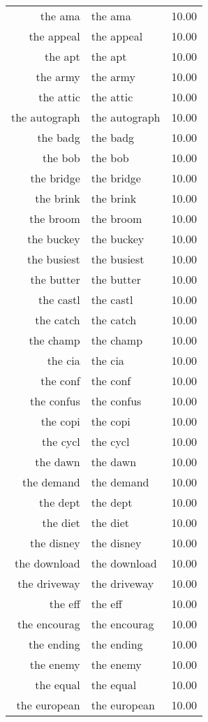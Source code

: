 \begin{table}[ht]
\begin{tabular}{rlr}
  the ama & the ama & 10.00 \\ 
  the appeal & the appeal & 10.00 \\ 
  the apt & the apt & 10.00 \\ 
  the army & the army & 10.00 \\ 
  the attic & the attic & 10.00 \\ 
  the autograph & the autograph & 10.00 \\ 
  the badg & the badg & 10.00 \\ 
  the bob & the bob & 10.00 \\ 
  the bridge & the bridge & 10.00 \\ 
  the brink & the brink & 10.00 \\ 
  the broom & the broom & 10.00 \\ 
  the buckey & the buckey & 10.00 \\ 
  the busiest & the busiest & 10.00 \\ 
  the butter & the butter & 10.00 \\ 
  the castl & the castl & 10.00 \\ 
  the catch & the catch & 10.00 \\ 
  the champ & the champ & 10.00 \\ 
  the cia & the cia & 10.00 \\ 
  the conf & the conf & 10.00 \\ 
  the confus & the confus & 10.00 \\ 
  the copi & the copi & 10.00 \\ 
  the cycl & the cycl & 10.00 \\ 
  the dawn & the dawn & 10.00 \\ 
  the demand & the demand & 10.00 \\ 
  the dept & the dept & 10.00 \\ 
  the diet & the diet & 10.00 \\ 
  the disney & the disney & 10.00 \\ 
  the download & the download & 10.00 \\ 
  the driveway & the driveway & 10.00 \\ 
  the eff & the eff & 10.00 \\ 
  the encourag & the encourag & 10.00 \\ 
  the ending & the ending & 10.00 \\ 
  the enemy & the enemy & 10.00 \\ 
  the equal & the equal & 10.00 \\ 
  the european & the european & 10.00 \\ 

\end{tabular}
\end{table}
